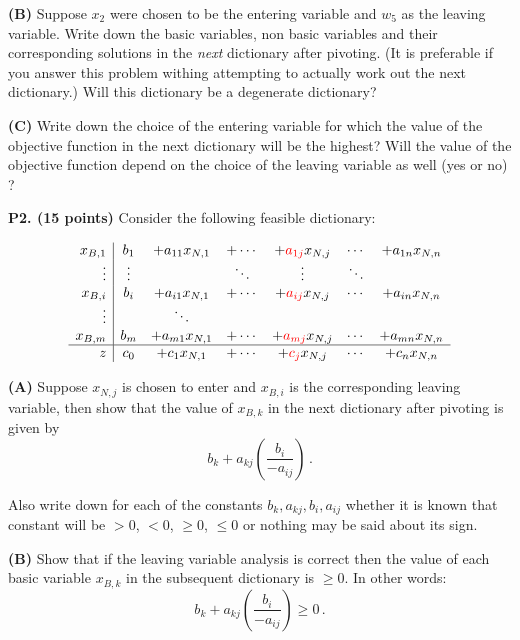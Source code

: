 \documentclass[11pt]{article}
\newcommand\red[1]{\textcolor{red}{#1}}
\begin{document}
\medskip

\noindent\textbf{(B)} Suppose $x_2$ were chosen to be the entering
variable and $w_5$ as the leaving variable. Write down the basic
variables, non basic variables and their corresponding solutions in
the  \emph{next} dictionary after pivoting. (It is preferable if you
answer this problem withing  attempting to actually work out the next
dictionary.) Will this dictionary be a
degenerate dictionary?

\medskip

\noindent\textbf{(C)} Write down the choice of the entering variable
for which the value of the objective function in the next dictionary
will be the highest? Will the value of the objective function depend
on the choice of the leaving variable as well (yes or no) ?

\medskip


\textbf{P2. (15 points)}  Consider the following feasible dictionary:

\[\begin{array}{r|c c c c c c c c}
x_{B,1} & b_1 & + a_{11} x_{N,1} & + \cdots & + \red{a_{1j}} x_{N,j} & \cdots & + a_{1n} x_{N,n}\\
\vdots & \vdots &  & \ddots & \vdots & \ddots  \\
x_{B,i} & b_i & +a_{i1} x_{N,1} & + \cdots & +\red{ a_{ij}} x_{N,j} & \cdots
                                                                & + a_{in} x_{N,n} \\
\vdots & & \ddots & \\ 
x_{B,m} & b_m & + a_{m1} x_{N,1} & + \cdots & +\red{ a_{mj} } x_{N,j} &
                                                                 \cdots  & + a_{mn} x_{N,n} \\
\hline
z & c_0 & + c_1 x_{N,1} & + \cdots & + \red{c_j} x_{N,j} & \cdots & + c_n x_{N,n}\\
\end{array}\]

\noindent \textbf{(A)} Suppose $x_{N,j}$ is chosen to enter and
$x_{B,i}$ is the corresponding leaving variable, then show that the
value of $x_{B,k}$ in the next dictionary after pivoting is given by
\[ b_k + a_{kj} \left(\frac{b_i}{ - a_{ij}}\right)  \,.\]

Also write down for each of the constants $b_k, a_{kj}, b_i, a_{ij}$
whether it is known that constant will be $> 0$, $< 0$, $\geq 0$,
$\leq 0$ or nothing may be said about its sign.

\medskip

\noindent \textbf{(B)} Show that if the leaving variable analysis is
correct then  the value of each basic variable $x_{B,k}$ in the
subsequent 
dictionary is  $\geq 0$. In other words: 
\[  b_k + a_{kj} \left(\frac{b_i}{ - a_{ij}}\right)  \geq 0 \,.\]
\end{document}
